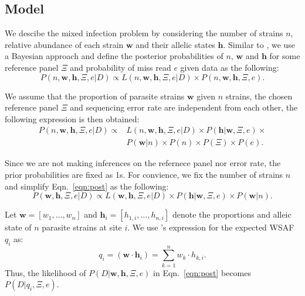 \documentclass{bioinfo}
\begin{document}
\subsection{Model}
We descibe the mixed infection problem by considering the number of strains $n$, relative abundance of each strain $\mathbf{w}$ and their allelic states $\mathbf{h}$. Similar to \citet{Jack2016}, we use a Bayesian approach and define the posterior probabilities of $n$, $\mathbf{w}$ and $\mathbf{h}$ for some reference panel $\Xi$ and probability of miss read $e$ given data as the following:
$$P(n, \mathbf{w}, \mathbf{h}, \Xi, e |D) \propto L(n, \mathbf{w}, \mathbf{h}, \Xi, e|D) \times P(n, \mathbf{w}, \mathbf{h}, \Xi, e).
$$

We assume that the proportion of parasite strains $\mathbf{w}$ given $n$ strains, the chosen reference panel $\Xi$ and sequencing error rate are independent from each other, the following expression is then obtained:
\begin{equation}
\begin{split}
P(n, \mathbf{w}, \mathbf{h}, \Xi, e|D) \propto & L(n, \mathbf{w}, \mathbf{h}, \Xi, e | D) \times P(\mathbf{h}|\mathbf{w}, \Xi, e) \times \\
                                               & P(\mathbf{w}|n) \times P(n) \times P(\Xi) \times P(e).\label{eqn:post}
\end{split}
\end{equation}

Since we are not making inferences on the refernece panel nor error rate, the prior probabilities are fixed as 1s. For convience, we fix the number of strains $n$ and simplify Eqn.~\eqref{eqn:post} as the following:
\begin{equation}
P(\mathbf{w}, \mathbf{h}, \Xi, e |D) \propto L(\mathbf{w}, \mathbf{h}, \Xi, e|D) \times P(\mathbf{h}|\mathbf{w}, \Xi, e) \times P(\mathbf{w}|n).
\end{equation}

Let $\mathbf w = [w_1,\dots, w_n]$ and $\mathbf{h}_i = [h_{1,i},\dots,h_{n,i}]$ denote the proportions and alleic state of $n$ parasite strains at site $i$. We use \citet{Jack2016}'s expression for the expected WSAF $q_{i}$ as:
\begin{equation}
q_i= (\mathbf{w}\cdot\mathbf{h}_{i})  =  \sum_{k=1}^{n} w_k \cdot h_{k,i} .\label{eqn:qij_full_sum}
\end{equation}
Thus, the likelihood of $P (D|\mathbf{w}, \mathbf{h},\Xi, e)$ in Eqn.~\eqref{eqn:post} becomes $P(D|q_{i},\Xi, e)$. %
\end{document}
